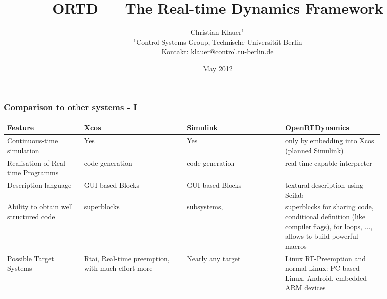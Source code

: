 \documentclass[serif,9pt,xcolor=dvipsnames]{beamer}
\title[]{ORTD --- The Real-time Dynamics Framework}
\subtitle{} %
\date{May 2012}
\author{Christian Klauer$^{1}$\\
\tiny $^{1}$Control Systems Group, Technische Universität Berlin\\
Kontakt: klauer@control.tu-berlin.de
}
\begin{document}






\begin{frame}
  \frametitle{Comparison to other systems - I}

{\small

  \begin{tabular}{p{0.18\linewidth}|p{0.24\linewidth}|p{0.23\linewidth}|p{0.23\linewidth}|}
  Feature & Xcos & Simulink & OpenRTDynamics \\
\hline
	Continuous-time simulation  &   Yes   &   Yes       &  only by embedding into Xcos (planned Simulink)         \\
\hline
	Realisation of Real-time Programms  &  code generation    &   code generation       &       real-time capable interpreter       \\
\hline
	Description language &  GUI-based Blocks  & GUI-based Blocks  &  textural description using Scilab    \\
\hline
	Ability to obtain well structured code &  superblocks  & subsystems,  &  superblocks for sharing code, conditional definition (like compiler flags), for loops, ..., allows to build powerful macros  \\
\hline
	Possible Target Systems &  Rtai, Real-time preemption, with much effort more & Nearly any target  &  Linux RT-Preemption and normal Linux: PC-based Linux, Android, embedded ARM devices  \\
  \end{tabular}

}

\end{frame}
\end{document}
